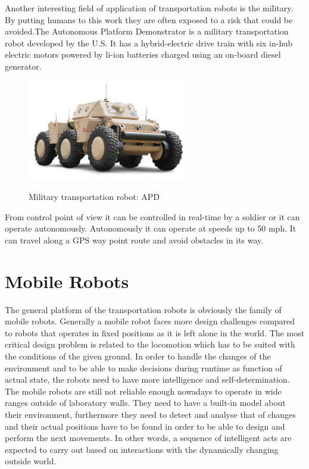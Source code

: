 \documentclass[12pt,english]{article}
\begin{document}
Another interesting field of application of transportation robots is the military. By putting humans to this work they are often exposed to a risk that could be avoided.The Autonomous Platform Demonstrator is a military transportation robot developed by the U.S. It has a hybrid-electric drive train with six in-hub electric motors powered by li-ion batteries charged using an on-board diesel generator. 

\begin{figure}[h]
	\centering
	\includegraphics[width=7cm]{figures/apd.jpg}
	\label{bmw}
	\caption{Military transportation robot: APD}
\end{figure}

From control point of view it can be controlled in real-time by a soldier or it can operate autonomously. Autonomously it can operate at speeds up to 50 mph. It can travel along a GPS way point route and avoid obstacles in its way. \cite{apd}






\newpage

\section{Mobile Robots}
The general platform of the transportation robots is obviously the family of mobile robots. Generally a mobile robot faces more design challenges compared to robots that operates in fixed positions as it is left alone in the world. The most critical design problem is related to the locomotion which has to be suited with the conditions of the given ground. In order to handle the changes of the environment and to be able to make decisions during runtime as function of actual state, the robots need to have more intelligence and self-determination. The mobile robots are still not reliable enough nowadays to operate in wide ranges outside of laboratory walls. They need to have a built-in model about their environment, furthermore they need to detect and analyse that of changes and their actual positions have to be found in order to be able to design and perform the next movements. In other words, a sequence of intelligent acts are expected to carry out based on interactions with the dynamically changing outside world.
\end{document}

